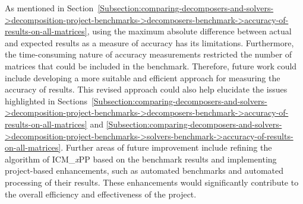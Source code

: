 As mentioned in Section~\ref{Subsection:comparing-decomposers-and-solvers->decomposition-project-benchmarks->decomposers-benchmark->accuracy-of-results-on-all-matrices}, using the maximum absolute difference between actual and expected results as a measure of accuracy has its limitations. Furthermore, the time-consuming nature of accuracy measurements restricted the number of matrices that could be included in the benchmark. Therefore, future work could include developing a more suitable and efficient approach for measuring the accuracy of results. This revised approach could also help elucidate the issues highlighted in Sections~\ref{Subsection:comparing-decomposers-and-solvers->decomposition-project-benchmarks->decomposers-benchmark->accuracy-of-results-on-all-matrices} and \ref{Subsection:comparing-decomposers-and-solvers->decomposition-project-benchmarks->solvers-benchmark->accuracy-of-results-on-all-matrices}. Further areas of future improvement include refining the algorithm of ICM\_\textit{x}PP based on the benchmark results and implementing project-based enhancements, such as automated benchmarks and automated processing of their results. These enhancements would significantly contribute to the overall efficiency and effectiveness of the project.